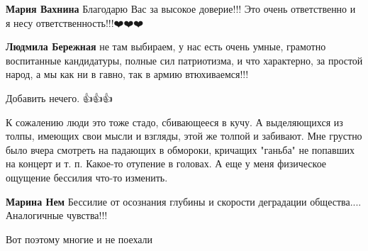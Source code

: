 \begin{itemize}
\begin{itemize}
\textbf{Мария Вахнина} Благодарю Вас за высокое доверие!!!
Это очень ответственно и я несу ответственность!!!❤️❤️❤️

 
\textbf{Людмила Бережная} не там выбираем, у нас есть очень умные, грамотно воспитанные кандидатуры, полные сил патриотизма, и что характерно, за простой народ, а мы как ни в гавно, так в армию втюхиваемся!!!
\end{itemize}

 

Добавить нечего. 👍👍👍

К сожалению люди это тоже стадо, сбивающееся в кучу. А выделяющихся из толпы,
имеющих свои мысли и взгляды, этой же толпой и забивают. Мне грустно было вчера
смотреть на падающих в обмороки, кричащих "ганьба" не попавших на концерт и т.
п. Какое-то отупение в головах. А еще у меня физическое ощущение бессилия
что-то изменить.

\begin{itemize}
 
\textbf{Марина Нем} Бессилие от осознания глубины и скорости деградации общества....
Аналогичные чувства!!!
\end{itemize}

 
Вот поэтому многие и не поехали

 

\end{itemize}
